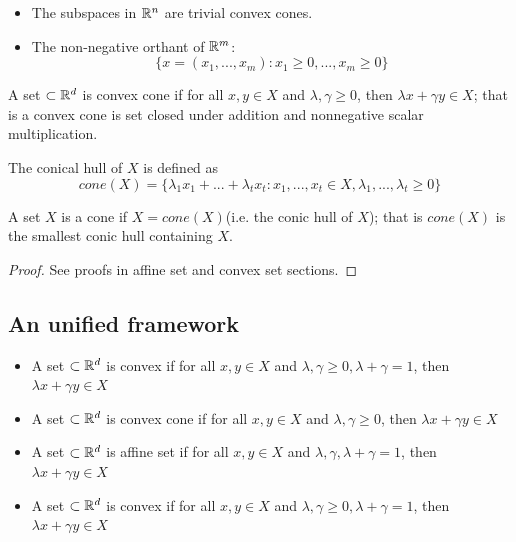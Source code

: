 \begin{refsection}
\begin{example}
\begin{itemize}
\item The subspaces in $\mathbb{R}^n$ are trivial convex cones.
\item The non-negative orthant of $\mathbb{R}^m$:
$$\{x=(x_1,...,x_m):x_1 \geq 0,...,x_m \geq 0\}$$
\end{itemize}
\end{example}

\begin{definition}
\cite[lec 1]{Basu2016introduction}\cite[14]{rockafellar1997convex}
A set $\subset \mathbb{R}^d$ is convex cone if for all $x,y\in X$ and $\lambda, \gamma \geq 0$, then $\lambda x + \gamma y \in X$; that is a convex cone is set closed under addition and nonnegative scalar multiplication.
\end{definition}


\begin{definition}\cite[lec 1]{Basu2016introduction}
The conical hull of $X$ is defined as 
		$$cone(X) = \{\lambda_1 x_1 + ... + \lambda_t x_t: x_1,...,x_t\in X,\lambda_1,...,\lambda_t \geq 0\} $$
\end{definition}

\begin{lemma}\hfill
A set $X$ is a cone if $X = cone(X)$(i.e. the conic hull of $X$); that is $cone(X)$ is the smallest conic hull containing $X$.
\end{lemma}
\begin{proof}
See proofs in affine set and convex set sections.
\end{proof}




\subsection{An unified framework}

\begin{definition}\hfill {}
\cite[lec 1]{Basu2016introduction}
\begin{itemize}
	\item A set $\subset \mathbb{R}^d$ is convex if for all $x,y\in X$ and $\lambda, \gamma \geq 0, \lambda + \gamma = 1$, then $\lambda x + \gamma y \in X$
	\item A set $\subset \mathbb{R}^d$ is convex cone if for all $x,y\in X$ and $\lambda, \gamma \geq 0$, then $\lambda x + \gamma y \in X$
	\item A set $\subset \mathbb{R}^d$ is affine set if for all $x,y\in X$ and $\lambda, \gamma, \lambda + \gamma = 1$, then $\lambda x + \gamma y \in X$
	\item A set $\subset \mathbb{R}^d$ is convex if for all $x,y\in X$ and $\lambda, \gamma \geq 0, \lambda + \gamma = 1$, then $\lambda x + \gamma y \in X$
\end{itemize}
\end{definition}	





\end{refsection}

